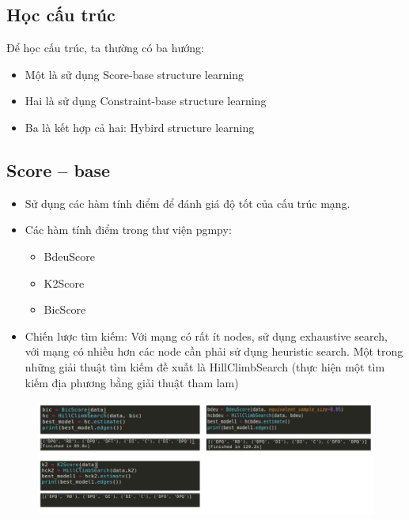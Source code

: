 \documentclass[12pt]{report}
\begin{document}
\subsection{Học cấu trúc}
Để học cấu trúc, ta thường có ba hướng: 
\begin{itemize}
\item Một là sử dụng Score-base structure learning
\item Hai là sử dụng Constraint-base structure learning
\item Ba là kết hợp cả hai: Hybird structure learning
\end{itemize}

\subsection{Score – base}
\begin{itemize}
\item Sử dụng các hàm tính điểm để đánh giá độ tốt của cấu trúc mạng. 
\item Các hàm tính điểm trong thư viện pgmpy:
\begin{itemize}
\item BdeuScore
\item K2Score
\item BicScore
\end{itemize}
\item Chiến lược tìm kiếm: Với mạng có rất ít nodes, sử dụng exhaustive search, với mạng có nhiều hơn các node cần phải sử dụng heuristic search. Một trong những giải thuật tìm kiếm đề xuất là HillClimbSearch (thực hiện một tìm kiếm địa phương bằng giải thuật tham lam)
\end{itemize}
\begin{figure}[h]
\centering
\includegraphics[width=\textwidth]{BIC.png}
\end{figure}
\end{document}
